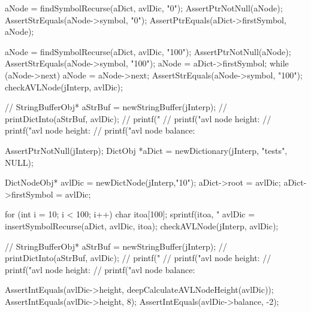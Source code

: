   aNode = findSymbolRecurse(aDict, avlDic, "0");
  AssertPtrNotNull(aNode);
  AssertStrEquals(aNode->symbol, "0");
  AssertPtrEquals(aDict->firstSymbol, aNode);
  
  aNode = findSymbolRecurse(aDict, avlDic, "100");
  AssertPtrNotNull(aNode);
  AssertStrEquals(aNode->symbol, "100");
  aNode = aDict->firstSymbol;
  while (aNode->next) aNode = aNode->next;
  AssertStrEquals(aNode->symbol, "100");
  checkAVLNode(jInterp, avlDic);
  
//  StringBufferObj* aStrBuf = newStringBuffer(jInterp);
//  printDictInto(aStrBuf, avlDic);
//  printf("%
//  printf("avl node height: %
//  printf("avl node height: %
//  printf("avl node balance: %
\stopCTest
\stopTestCase

\startCTest
  AssertPtrNotNull(jInterp);
  DictObj *aDict = newDictionary(jInterp, "tests", NULL);

  DictNodeObj* avlDic = newDictNode(jInterp,"10");
  aDict->root         = avlDic;
  aDict->firstSymbol  = avlDic;

  for (int i = 10; i < 100; i++) {
    char itoa[100];
    sprintf(itoa, "%
    avlDic = insertSymbolRecurse(aDict, avlDic, itoa);
  }
  checkAVLNode(jInterp, avlDic);

//  StringBufferObj* aStrBuf = newStringBuffer(jInterp);
//  printDictInto(aStrBuf, avlDic);
//  printf("%
//  printf("avl node height: %
//  printf("avl node height: %
//  printf("avl node balance: %

  AssertIntEquals(avlDic->height, deepCalculateAVLNodeHeight(avlDic));
  AssertIntEquals(avlDic->height, 8);
  AssertIntEquals(avlDic->balance, -2);
\stopCTest
\stopTestCase
\stopTestSuite